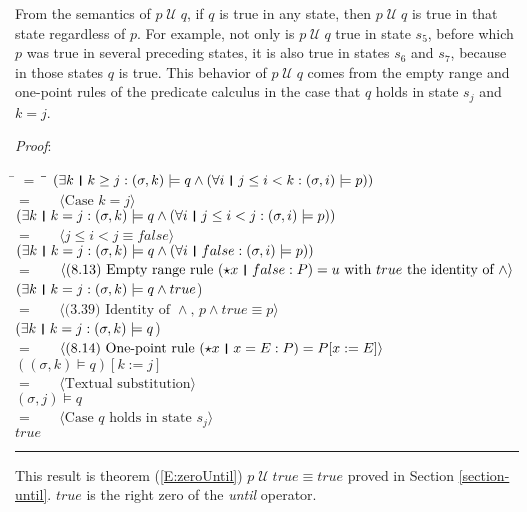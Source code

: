 \documentclass[12pt, fleqn, leqno]{article}
\newcommand{\lgap}{2pt}                             %
\newcommand{\mymathindent}{24pt}                    %
\newcommand{\Until}{\;\mathcal{U}\;}
\newcommand{\myqed}{\rule[-.23ex]{1.2ex}{2.0ex}}
\newcommand{\myqedtab}{\hspace{384pt}}              %
\newcommand{\thedr}{\rule[-.25ex]{.32mm}{1.75ex}}   %
\newcommand{\dr}{\;\,\thedr\,\;}                    %
\newcommand{\rb}{:}                                 %
\newcommand{\all}{\forall}                          %
\newcommand{\ext}{\exists}                          %
\newcommand{\Gll} {\langle}                         %
\newcommand{\Ggg} {\rangle}                         %
\newcommand{\Hint}[1]     {\ \ \ $\Gll              \mbox{#1} \Ggg$ }   %
\begin{document}
From the semantics of $p\Until q$, if $q$ is true in any state, then $p\Until q$ is true in that state regardless of $p$.
For example, not only is $p\Until q$ true in state $s_5$, before which $p$ was true in several preceding states,
it is also true in states $s_6$ and $s_7$, because in those states $q$ is true.
This behavior of $p\Until q$ comes from the empty range and one-point rules \cite{LADM} of the predicate calculus in the case that
$q$ holds in state $s_j$ and $k=j$.

\emph{Proof}:
\begin{tabbing}
\hspace{\mymathindent} \= $= \;$ \= \myqedtab \= \kill
	\> \>   $(\ext k \dr k \ge j \rb (\sigma,k) \models q \land (\all i \dr j\le i < k \rb (\sigma,i) \models p))$\\[\lgap]
	\> $=$  \>  \Hint{Case $k=j$}\\[\lgap]
	\> \>   $(\ext k \dr k=j \rb (\sigma,k) \models q \land (\all i \dr j\le i < j \rb (\sigma,i) \models p))$\\[\lgap]
	\> $=$  \>  \Hint{$j\le i < j \equiv false$}\\[\lgap]
	\> \>   $(\ext k \dr k=j \rb (\sigma,k) \models q \land (\all i \dr false \rb (\sigma,i) \models p))$\\[\lgap]
	\> $=$  \>  \Hint{(8.13) Empty range rule $(\star x \dr false \rb P) =u$ with $true$ the identity of $\land$}\\[\lgap]
	\> \>   $(\ext k \dr k=j \rb (\sigma,k) \models q \land true$)\\[\lgap]
	\> $=$  \>  \Hint{(3.39) Identity of $\land$, $p \land true \equiv p$}\\[\lgap]
	\> \>   $(\ext k \dr k=j \rb (\sigma,k) \models q$)\\[\lgap]
	\> $=$  \>  \Hint{(8.14) One-point rule $(\star x\dr x=E\rb P) = P[x:=E]$}\\[\lgap]
	\> \>   $((\sigma,k) \models q)[k := j]$\\[\lgap]
	\> $=$  \>  \Hint{Textual substitution}\\[\lgap]
	\> \>   $(\sigma,j) \models q$\\[\lgap]
	\> $=$  \>  \Hint{Case $q$ holds in state $s_j$}\\[\lgap]
	\> \>   $true$ \quad \myqed
\end{tabbing}
This result is theorem (\ref{E:zeroUntil}) $p \Until true \equiv true$ proved in Section \ref{section-until}.
$true$ is the right zero of the \textit{until} operator.
\end{document}
